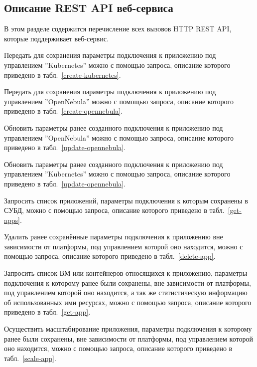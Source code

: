 \subsection{Описание REST API веб-сервиса}
В этом разделе содержится перечисление всех вызовов HTTP REST API, которые поддерживает веб-сервис.

Передать для сохранения параметры подключения к приложению под управлением ''Kubernetes'' можно с помощью запроса, описание которого приведено в табл.~\ref{create-kubernetes}.

Передать для сохранения параметры подключения к приложению под управлением ''OpenNebula'' можно с помощью запроса, описание которого приведено в табл.~\ref{create-opennebula}.

Обновить параметры ранее созданного подключения к приложению под управлением ''OpenNebula'' можно с помощью запроса, описание которого приведено в табл.~\ref{update-opennebula}.

Обновить параметры ранее созданного подключения к приложению под управлением ''Kubernetes'' можно с помощью запроса, описание которого приведено в табл.~\ref{update-opennebula}.

Запросить список приложений, параметры подключения к которым сохранены в СУБД, можно с помощью запроса, описание которого приведено в табл.~\ref{get-apps}.

Удалить ранее сохранённые параметры подключения к приложению вне зависимости от платформы, под управлением которой оно находится, можно с помощью запроса, описание которого приведено в табл.~\ref{delete-app}.

Запросить список ВМ или контейнеров относящихся к приложению, параметры подключения к которому ранее были сохранены, вне зависимости от платформы, под управлением которой оно находится, а так же статистическую информацию об использованных ими ресурсах, можно с помощью запроса, описание которого приведено в табл.~\ref{get-app}.

Осуществить масштабирование приложения, параметры подключения к которому ранее были сохранены, вне зависимости от платформы, под управлением которой оно находится, можно с помощью запроса, описание которого приведено в табл.~\ref{scale-app}.

